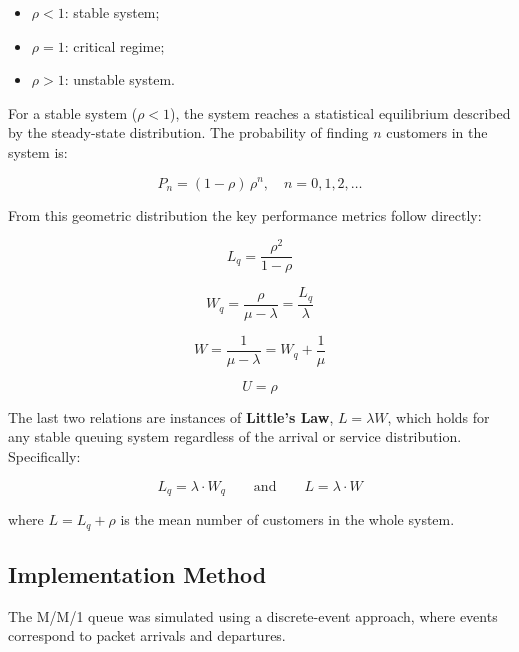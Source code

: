 \documentclass[12pt]{article}
\begin{document}
\begin{itemize}
    \item $\rho < 1$: stable system;
    \item $\rho = 1$: critical regime;
    \item $\rho > 1$: unstable system.
\end{itemize}

For a stable system ($\rho < 1$), the system reaches a statistical equilibrium described by
the steady-state distribution. The probability of finding $n$ customers in the system is:

\begin{equation}
P_n = (1-\rho)\,\rho^n, \quad n = 0, 1, 2, \ldots
\end{equation}

From this geometric distribution the key performance metrics follow directly:

\begin{equation}
L_q = \frac{\rho^2}{1 - \rho}
\end{equation}

\begin{equation}
W_q = \frac{\rho}{\mu - \lambda} = \frac{L_q}{\lambda}
\end{equation}

\begin{equation}
W = \frac{1}{\mu - \lambda} = W_q + \frac{1}{\mu}
\end{equation}

\begin{equation}
U = \rho
\end{equation}

The last two relations are instances of \textbf{Little's Law}, $L = \lambda W$, which holds for
any stable queuing system regardless of the arrival or service distribution. Specifically:

\begin{equation}
L_q = \lambda \cdot W_q \qquad \text{and} \qquad L = \lambda \cdot W
\end{equation}

where $L = L_q + \rho$ is the mean number of customers in the whole system.

\subsection{Implementation Method}

The M/M/1 queue was simulated using a discrete-event approach, where events correspond to packet arrivals and departures.
\end{document}
